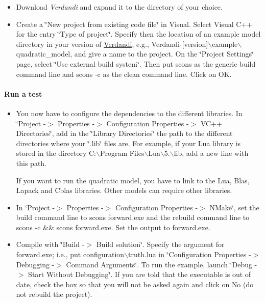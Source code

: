 \documentclass{tufte-book}
\begin{document}
\begin{itemize}
\item \-Download \-\emph{Verdandi} and expand it to the directory of your choice.


\item \-Create a \char`\"{}\-New project from existing code file\char`\"{} in \-Visual. \-Select \-Visual \-C++ for the entry \char`\"{}\-Type of project\char`\"{}. \-Specify then the location of an example model directory in your version of \hyperlink{namespace_verdandi}{\-Verdandi}, e.\-g., {\ttfamily \-Verdandi-\/\mbox{[}version\mbox{]}$\backslash$example$\backslash$quadratic\-\_\-model}, and give a name to the project. \-On the \char`\"{}\-Project Settings\char`\"{} page, select \char`\"{}\-Use external build system\char`\"{}. \-Then put {\ttfamily scons} as the generic build command line and {\ttfamily scons -\/c} as the clean command line. \-Click on \-O\-K.
\end{itemize}


\hypertarget{installation_test}{}\paragraph{\-Run a test}\label{installation_test}


\begin{itemize}
\item \-You now have to configure the dependencies to the different libraries. \-In \char`\"{}\-Project -\/$>$ Properties -\/$>$ Configuration Properties -\/$>$ V\-C++ Directories\char`\"{}, add in the \char`\"{}\-Library Directories\char`\"{} the path to the different directories where your \char`\"{}.\-lib\char`\"{} files are. \-For example, if your \-Lua library is stored in the directory {\ttfamily \-C\-:$\backslash$\-Program \-Files$\backslash$\-Lua$\backslash$5.$\backslash$lib}, add a new line with this path.

\-If you want to run the quadratic model, you have to link to the \-Lua, \-Blas, \-Lapack and \-Cblas libraries. \-Other models can require other libraries.




\item \-In \char`\"{}\-Project -\/$>$ Properties -\/$>$ Configuration Properties -\/$>$ N\-Make\char`\"{}, set the build command line to {\ttfamily scons forward.\-exe} and the rebuild command line to {\ttfamily scons -\/c \&\& scons forward.\-exe}. \-Set the output to {\ttfamily forward.\-exe}.


\item \-Compile with \char`\"{}\-Build -\/$>$ Build solution\char`\"{}. \-Specify the argument for {\ttfamily forward.\-exe}; i.\-e., put {\ttfamily configuration$\backslash$truth.\-lua} in \char`\"{}\-Configuration Properties -\/$>$ Debugging -\/$>$ Command Arguments\char`\"{}. \-To run the example, launch \char`\"{}\-Debug -\/$>$ Start Without Debugging\char`\"{}. \-If you are told that the executable is out of date, check the box so that you will not be asked again and click on {\ttfamily \-No} (do not rebuild the project).
\end{itemize}
\end{document}
